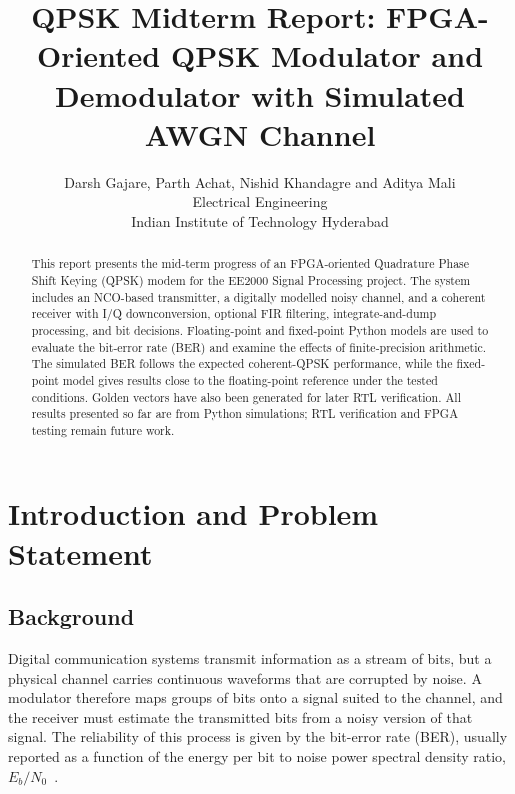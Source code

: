 \documentclass[10pt,twocolumn,letterpaper]{article}
\begin{document}
\title{QPSK Midterm Report: FPGA-Oriented QPSK Modulator and Demodulator with Simulated AWGN Channel}

\author{Darsh Gajare, Parth Achat, Nishid Khandagre and Aditya Mali\\
Electrical Engineering\\
Indian Institute of Technology Hyderabad}
\maketitle

\begin{abstract}
This report presents the mid-term progress of an FPGA-oriented Quadrature Phase Shift Keying (QPSK) modem for the EE2000 Signal Processing project. The system includes an NCO-based transmitter, a digitally modelled noisy channel, and a coherent receiver with I/Q downconversion, optional FIR filtering, integrate-and-dump processing, and bit decisions. Floating-point and fixed-point Python models are used to evaluate the bit-error rate (BER) and examine the effects of finite-precision arithmetic. The simulated BER follows the expected coherent-QPSK performance, while the fixed-point model gives results close to the floating-point reference under the tested conditions. Golden vectors have also been generated for later RTL verification. All results presented so far are from Python simulations; RTL verification and FPGA testing remain future work.
\end{abstract}

\section{Introduction and Problem Statement}

\subsection{Background}

Digital communication systems transmit information as a stream of bits, but a physical channel carries continuous waveforms that are corrupted by noise. A modulator therefore maps groups of bits onto a signal suited to the channel, and the receiver must estimate the transmitted bits from a noisy version of that signal. The reliability of this process is given by the bit-error rate (BER), usually reported as a function of the energy per bit to noise power spectral density ratio, $E_b/N_0$~\cite{proakis}.
\end{document}
